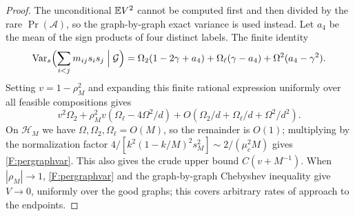 \begin{proof}
The unconditional $\mathbb E V^2$ cannot be computed first and then divided by the rare $\Pr(\mathcal
A)$, so the graph-by-graph exact variance is used instead. Let $a_4$ be the mean of the sign
products of four distinct labels. The finite identity
\[
\operatorname{Var}_s\Bigl(\sum_{i<j}m_{ij}s_is_j\Bigm|\mathcal G\Bigr)=\Omega_2(1-2\gamma+a_4)+\Omega_\ell(\gamma-a_4)+\Omega^2(a_4-\gamma^2).
\]
Setting $v=1-\rho_M^2$ and expanding this finite rational expression uniformly over all feasible
compositions gives
\[
v^2\Omega_2+\rho_M^2v(\Omega_\ell-4\Omega^2/d)+O(\Omega_2/d+\Omega_\ell/d+\Omega^2/d^2).
\]
On $\mathcal H_M$ we have $\Omega,\Omega_2,\Omega_\ell=O(M)$, so the remainder is $O(1)$;
multiplying by the normalization factor $4/[k^2(1-k/M)^2s_M^2]\sim2/(\mu_c^2M)$ gives
\eqref{F:pergraphvar}. This also gives the crude upper bound $C(v+M^{-1})$. When
$|\rho_M|\to1$, \eqref{F:pergraphvar} and the graph-by-graph Chebyshev inequality give $V\to0$,
uniformly over the good graphs; this covers arbitrary rates of approach to the endpoints.
\end{proof}

